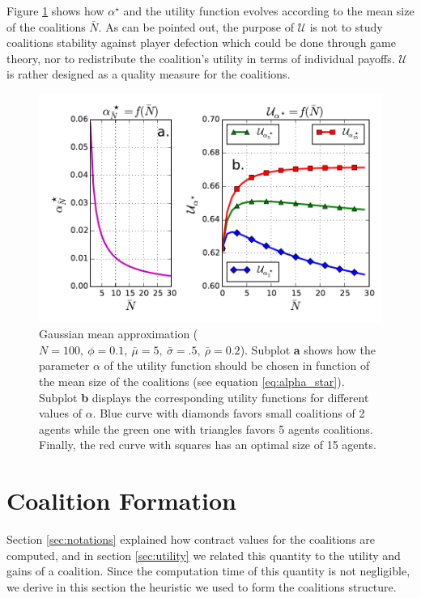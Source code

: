 \documentclass[journal]{IEEEtran}
\begin{document}
Figure \ref{fig:mean_approx} shows how $ \alpha^{\star} $ and the utility function evolves according to the mean size of the coalitions $ \bar{N} $. As can be pointed out, the purpose of $ \mathcal{U} $ is not to study coalitions stability against player defection which could be done through game theory, nor to redistribute the coalition's utility in terms of individual payoffs. $ \mathcal{U} $ is rather designed as a quality measure for the coalitions.

\begin{figure}
\includegraphics[scale=.48]{./figs/figure_2}
\caption{{\footnotesize Gaussian mean approximation ($N=100,\ \phi=0.1,\ \bar{\mu}=5,\ \bar{\sigma}=.5,\ \bar{\rho}=0.2 $). Subplot \textbf{a} shows how the parameter $ \alpha $ of the utility function should be chosen in function of the mean size of the coalitions (see equation \ref{eq:alpha_star}). Subplot \textbf{b} displays the corresponding utility functions for different values of $ \alpha $. Blue curve with diamonds favors small coalitions of 2 agents while the green one with triangles favors 5 agents coalitions. Finally, the red curve with squares has an optimal size of 15 agents.} }
\label{fig:mean_approx}
\end{figure}

%
%
\section{Coalition Formation}
\label{sec:forming}
Section \ref{sec:notations} explained how contract values for the coalitions are computed, and in section \ref{sec:utility} we related this quantity to the utility and gains of a coalition. Since the computation time of this quantity is not negligible, we derive in this section the heuristic we used to form the coalitions structure. 
\end{document}
